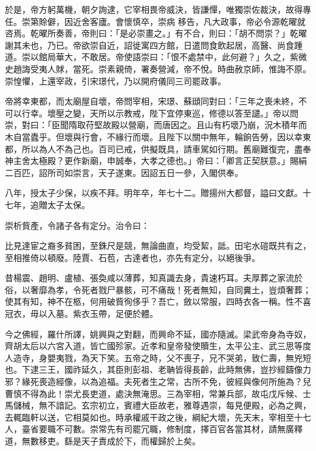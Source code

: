 \begin{pinyinscope}
於是，帝方躬萬機，朝夕詢逮，它宰相畏帝威決，皆謙憚，唯獨崇佐裁決，故得專任。崇第賒僻，因近舍客廬。會懷慎卒，崇病
 移告，凡大政事，帝必令源乾曜就咨焉。乾曜所奏善，帝則曰：「是必崇畫之。」有不合，則曰：「胡不問崇？」乾曜謝其未也，乃已。帝欲崇自近，詔徙寓四方館，日遣問食飲起居，高醫、尚食踵道。崇以館局華大，不敢居。帝使語崇曰：「恨不處禁中，此何避？」久之，紫微史趙誨受夷人賕，當死。崇素親倚，署奏營減，帝不悅。時曲赦京師，惟誨不原。崇惶懼，上還宰政，引宋璟代，乃以開府儀同三司罷政事。



 帝將幸東都，而太廟屋自壞，帝問宰相，宋璟、蘇頲同對曰：「三年之喪未終，不可以行幸。壞壓之變，天所以示教戒，陛下宜停東巡，修德以答至譴。」帝以問崇，對曰：「臣聞隋取苻堅故殿以營廟，而唐因之。且山有朽壞乃崩，況木積年而木自當蠹乎。但壞與行會，不緣行而壞。且陛下以關中無年，輪餉告勞，因以幸東都，所以為人不為己也。百司已戒，供擬既具，請車駕如行期。舊廟難復完，盡奉神主舍太極殿？更作新廟，申誠奉，大孝之德也。」帝曰：「卿言正契朕意。」賜絹二百匹，詔所司如崇言，天子遂東。因詔五日一參，入閣供奉。



 八年，授太子少保，以疾不拜。明年卒，年七十二。贈揚州大都督，謚曰文獻。十七年，追贈太子太保。



 崇析貲產，令諸子各有定分。治令曰：



 比見達宦之裔多貧困，至銖尺是競，無論曲直，均受絜，詆。田宅水磑既共有之，至相推倚以頓廢。陸賈、石苞，古達者也，亦先有定分，以絕後爭。



 昔楊震、趙明、盧植、張奐咸以薄葬，知真識去身，貴速朽耳。夫厚葬之家流於俗，以奢靡為孝，令死者戮尸暴骸，可不痛哉！死者無知，自同糞土，豈煩奢葬；使其有知，神不在柩，何用破貲徇侈乎？吾亡，斂以常服，四時衣各一稱。性不喜冠衣，毋以入墓。紫衣玉帶，足便於體。



 今之佛經，羅什所譯，姚興與之對翻，而興命不延，國亦隨滅。梁武帝身為寺奴，齊胡太后以六宮入道，皆亡國殄家。近孝和皇帝發使贖生，太平公主、武三思等度人造寺，身嬰夷戮，為天下笑。五帝之時，父不喪子，兄不哭弟，致仁壽，無兇短也。下逮三王，國祚延久，其臣則彭祖、老聃皆得長齡，此時無佛，豈抄經鑄像力邪？緣死喪造經像，以為追福。夫死者生之常，古所不免，彼經與像何所施為？兒曹慎不得為此！崇尤長吏道，處決無淹思。三為宰相，常兼兵部，故屯戊斥候、士馬儲械，無不諳記。玄宗初立，賓禮大臣故老，雅尊遇崇，每見便殿，必為之興，去輒臨軒以送，它相莫如也。時承權戚干政之後，綱紀大壞，先天末，宰相至十七人，臺省要職不可數。崇常先有司罷冗職，修制度，擇百官各當其材，請無廣釋道，無數移吏。繇是天子責成於下，而權歸於上矣。




\end{pinyinscope}
